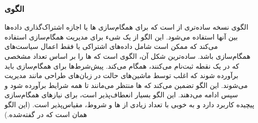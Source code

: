 \subsubsection{الگوی }
\label{archConRendezSec}
\begin{RTL}
الگوی  نسخه ساده‌تری از  است
که برای همگام‌سازی ها یا اجازه اشتراک‌گذاری داده‌ها بین آنها استفاده می‌شود.
این الگو از یک شیء  برای مدیریت همگام‌سازی استفاده می‌کند
که ممکن است شامل داده‌های اشتراکی یا فقط اعمال سیاست‌های همگام‌سازی باشد.
ساده‌ترین شکل آن، الگوی  است که
ها را بر اساس تعداد مشخصی که در یک نقطه ثبت‌نام می‌کنند،
همگام می‌کند. پیش‌شرط‌ها برای همگام‌سازی باید برآورده شوند که
اغلب توسط ماشین‌های حالت در زبان‌های طراحی مانند  مدیریت می‌شوند.
این الگو تضمین می‌کند که ها منتظر می‌مانند تا همه شرایط برآورده شود و سپس ادامه می‌دهند.
این الگو بسیار انعطاف‌پذیر است، برای نیازهای همگام‌سازی پیچیده کاربرد دارد
و به خوبی با تعداد زیادی از ها و شروط، مقیاس‌پذیر است.
(این الگو همان  است
که در \cite{ref1} گفته‌شده.)
\end{RTL}